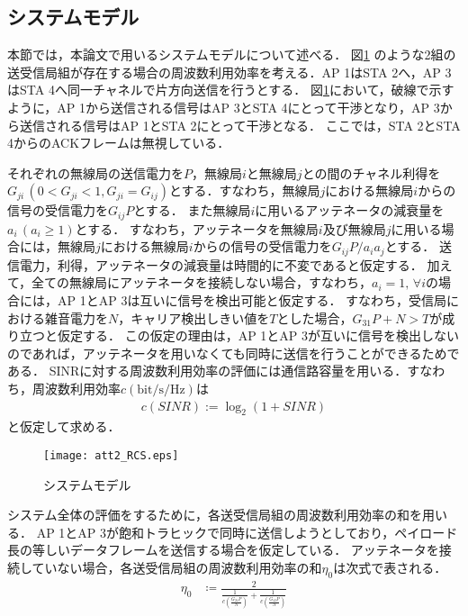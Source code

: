 \documentclass[master]{kuisthesis}		%
\begin{document}
\subsection{システムモデル}
本節では，本論文で用いるシステムモデルについて述べる．
図\ref{att} のような2組の送受信局組が存在する場合の周波数利用効率を考える．AP 1はSTA 2へ，AP 3はSTA 4へ同一チャネルで片方向送信を行うとする．
図\ref{att}において，破線で示すように，AP 1から送信される信号はAP 3とSTA 4にとって干渉となり，AP 3から送信される信号はAP 1とSTA 2にとって干渉となる．
ここでは，STA 2とSTA 4からのACKフレームは無視している．

それぞれの無線局の送信電力を$P$，無線局$i$と無線局$j$との間のチャネル利得を$G_{ji}\,(0<G_{ji}<1, G_{ji}=G_{ij})$とする．すなわち，無線局$j$における無線局$i$からの信号の受信電力を$G_{ij}P$とする．
また無線局$i$に用いるアッテネータの減衰量を$a_i\,(a_i \geq 1)$とする．
すなわち，アッテネータを無線局$i$及び無線局$j$に用いる場合には，無線局$j$における無線局$i$からの信号の受信電力を$G_{ij}P/a_{i}a_{j}$とする．
送信電力，利得，アッテネータの減衰量は時間的に不変であると仮定する．
加えて，全ての無線局にアッテネータを接続しない場合，すなわち，$a_i=1,\,\forall i$の場合には，AP 1とAP 3は互いに信号を検出可能と仮定する．
すなわち，受信局における雑音電力を$N$，キャリア検出しきい値を$T$とした場合，$G_{31}P+N>T$が成り立つと仮定する．
この仮定の理由は，AP 1とAP 3が互いに信号を検出しないのであれば，アッテネータを用いなくても同時に送信を行うことができるためである．
SINRに対する周波数利用効率の評価には通信路容量を用いる．すなわち，周波数利用効率$c\mathrm{(bit/s/Hz)}$は
\begin{align}
c(\mathit{SINR}) := \log_2(1+\mathit{SINR})
 \label{eq1}
\end{align}
と仮定して求める．

\ifnum {}
\begin{figure}[!t]
\centering
\texttt{[image: att2\_RCS.eps]}
\caption{システムモデル}
\label{att}
\end{figure}
\fi
システム全体の評価をするために，各送受信局組の周波数利用効率の和を用いる．
AP 1とAP 3が飽和トラヒックで同時に送信しようとしており，ペイロード長の等しいデータフレームを送信する場合を仮定している．
アッテネータを接続していない場合，各送受信局組の周波数利用効率の和$\eta_0$は次式で表される．
\begin{align}
\displaystyle \eta_0 &\coloneqq \displaystyle \frac {\displaystyle 2 }
{\displaystyle \frac{1}{\displaystyle c\left(\frac{G_{21} P}{N}\right)} + \frac{1}{\displaystyle c\left( \frac{G_{43} P}{N}\right)}}\label{eq2}
\end{align}
\end{document}
